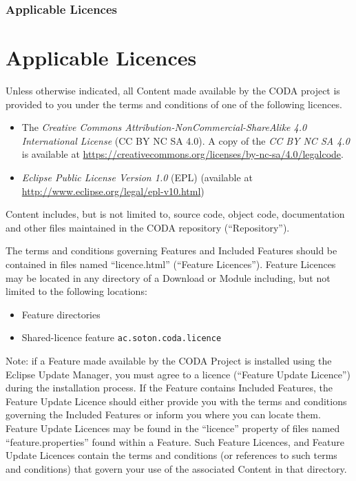   \subsubsection{Applicable Licences}
  \label{sec:vhdl-applicable-licences}
  \else
  \section{Applicable Licences}
  \label{sec:vhdl-applicable-licences}
  \fi
\fi
 
Unless otherwise indicated, all Content made available by the CODA
project is provided to you under the terms and conditions of one of
the following licences.

\begin{itemize}
\item The \emph{Creative Commons Attribution-NonCommercial-ShareAlike 4.0
    International License} (CC BY NC SA 4.0).  A copy of the \emph{CC BY NC SA
    4.0} is available at \url{https://creativecommons.org/licenses/by-nc-sa/4.0/legalcode}.

\item \emph{Eclipse Public License Version 1.0} (EPL) (available at 
   \url{http://www.eclipse.org/legal/epl-v10.html})
\end{itemize}

Content includes, but is not limited to, source code, object code,
documentation and other files maintained in the CODA repository (``Repository'').

The terms and conditions governing Features and Included Features
should be contained in files named ``licence.html'' (``Feature
Licences'').  Feature Licences may be located in any directory of a
Download or Module including, but not limited to the following
locations:

\begin{itemize}
\item Feature directories

\item Shared-licence feature \texttt{ac.soton.coda.licence}
\end{itemize}

Note: if a Feature made available by the CODA Project is
installed using the Eclipse Update Manager, you must agree to a
licence (``Feature Update Licence'') during the installation process.
If the Feature contains Included Features, the Feature Update
Licence should either provide you with the terms and conditions
governing the Included Features or inform you where you can locate
them.  Feature Update Licences may be found in the ``licence''
property of files named ``feature.properties'' found within a
Feature.  Such Feature Licences, and Feature Update
Licences contain the terms and conditions (or references to such
terms and conditions) that govern your use of the associated
Content in that directory.

